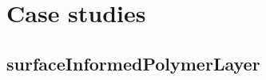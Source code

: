 \documentclass[10pt]{article}
\begin{document}
\section{Case studies}
\subsection{surfaceInformedPolymerLayer}
\begingroup
\def\CaseId{surfaceInformedPolymerLayer}
\def\CaseSourceDir{../surfaceInformedPolymerLayer}
\def\CaseOutputDir{../surfaceInformedPolymerLayer/output/surfaceInformedPolymerLayer}

\endgroup
\clearpage
\end{document}
